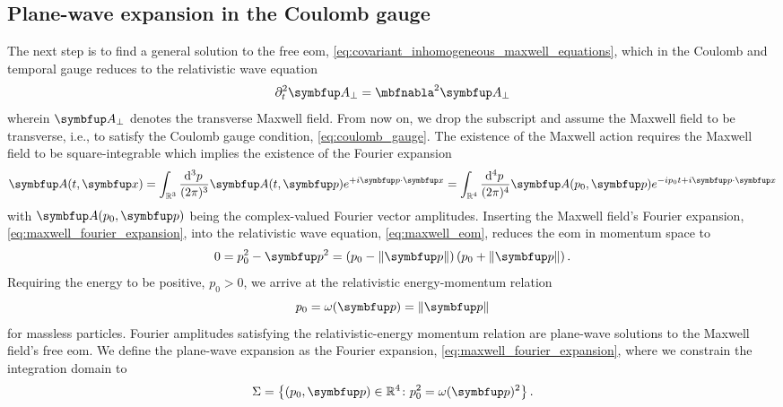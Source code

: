 \subsection{Plane-wave expansion in the Coulomb gauge}

The next step is to find a general solution to the free \gls{eom}, \cref{eq:covariant_inhomogeneous_maxwell_equations},
which in the Coulomb and temporal gauge reduces to the relativistic wave equation
\begin{equation}
	\partial_t^2
	\vb{A}_\perp
	=
	\laplace
	\vb{A}_\perp
	\label{eq:maxwell_eom}
\end{equation}
wherein $\vb{A}_\perp$ denotes the transverse Maxwell field.
From now on, we drop the subscript and assume the Maxwell field to be transverse, i.e., to satisfy the Coulomb gauge condition, \cref{eq:coulomb_gauge}.
The existence of the Maxwell action requires the Maxwell field to be square-integrable which implies the existence of the Fourier expansion
\begin{equation}
	\vb{A}(t,\vb{x})
	=
	\int_{\mathbb{R}^3}\frac{\dd[3]{p}}{(2\pi)^3}
	\vb{A}(t,\vb{p})
	e^{+i\vb{p}\vdot\vb{x}}
	=
	\int_{\mathbb{R}^4}\frac{\dd[4]{p}}{(2\pi)^4}
	\vb{A}(p_0,\vb{p})
	e^{-ip_0t+i\vb{p}\vdot\vb{x}}
	\label{eq:maxwell_fourier_expansion}
\end{equation}
with $\vb{A}(p_0,\vb{p})$ being the complex-valued Fourier vector amplitudes.
Inserting the Maxwell field's Fourier expansion, \cref{eq:maxwell_fourier_expansion}, into the relativistic wave equation, \cref{eq:maxwell_eom}, reduces the \gls{eom} in momentum space to
\begin{equation}
	0
	=
	p_0^2
	-
	\vb{p}^2
	=
	\left(
		p_0
		-
		\norm{\vb{p}}
	\right)
	\left(
		p_0
		+
		\norm{\vb{p}}
	\right)
	\label{eq:maxwell_eom_momentum}
	.
\end{equation}
Requiring the energy to be positive, $p_0>0$, we arrive at the relativistic energy-momentum relation
\begin{equation}
	p_0
	=
	\omega(\vb{p})
	=
	\norm{\vb{p}}
	\label{eq:energy_momentum_relation}
\end{equation}
for massless particles.
Fourier amplitudes satisfying the relativistic-energy momentum relation are plane-wave solutions to the Maxwell field's free \gls{eom}.
We define the plane-wave expansion as the Fourier expansion, \cref{eq:maxwell_fourier_expansion}, where we constrain the integration domain to
\begin{equation*}
	\Sigma
	=
	\left\{
		\left(p_0,\vb{p}\right)
		\in
		\mathbb{R}^4
		\colon
		p_0^2
		=
		\omega(\vb{p})^2
	\right\}
	.
\end{equation*}
